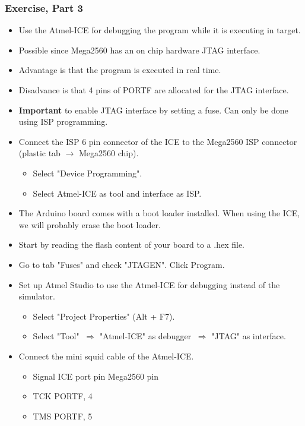 \subsubsection{Exercise, Part 3}
\begin{itemize}
	\item  Use the Atmel-ICE for debugging the program while it is
	executing in target.
	\item Possible since Mega2560 has an on chip hardware JTAG interface. 
	\item Advantage is that the program is executed in real time.
	\item Disadvance is that 4 pins of PORTF are allocated for the JTAG interface.
	\item \textbf{Important} to enable JTAG interface by setting a fuse. Can only be done using ISP programming. 
	\item Connect the ISP 6 pin connector of the ICE to the Mega2560 ISP connector (plastic tab $\rightarrow$ Mega2560 chip).
	\begin{itemize}
		\item Select "Device Programming".
		\item Select Atmel-ICE as tool and interface as	ISP.
	\end{itemize}
	\item The Arduino board comes with a boot loader installed. When using the ICE, we will probably erase the boot loader.
	\item Start by reading the flash content of your board to a .hex file.
	\item Go to tab "Fuses" and check "JTAGEN". Click Program.
	\item Set up Atmel Studio to use the Atmel-ICE for debugging instead of the simulator.
	\begin{itemize}
		\item Select "Project Properties" (Alt + F7).
		\item Select "Tool" $\:\Rightarrow$ "Atmel-ICE" as debugger $\:\Rightarrow$ "JTAG" as interface. 
	\end{itemize}
	\item Connect the mini squid cable of the Atmel-ICE.
	\begin{itemize}
		\item Signal \space\space ICE port pin \space Mega2560 pin
		\item TCK \space\space{} \space\space\space\space\space\space\space\space\space\space\space\space\space\space\space\space\space PORTF, 4
		\item TMS \space\space{} \space\space\space\space\space\space\space\space\space\space\space\space\space\space\space\space\space PORTF, 5

\end{itemize}
\end{itemize}
